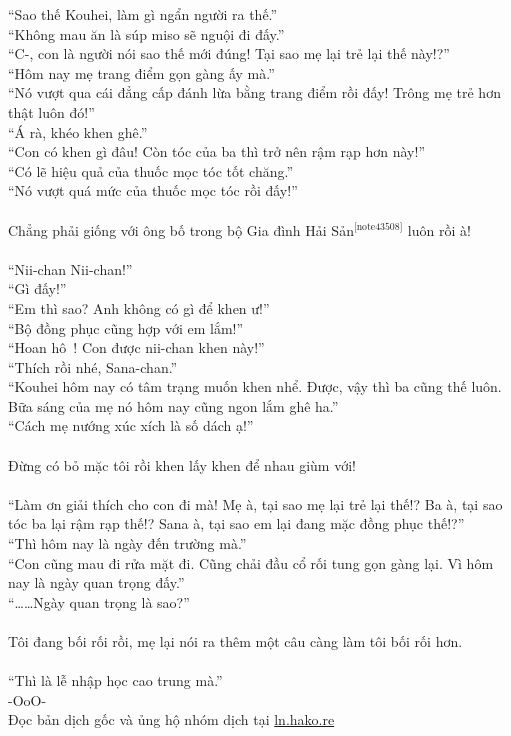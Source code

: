 \documentclass[12pt,a4paper, twosides]{book}
\begin{document}
“Sao thế Kouhei, làm gì ngẩn người ra thế.”\\
“Không mau ăn là súp miso sẽ nguội đi đấy.”\\
“C-, con là người nói sao thế mới đúng! Tại sao mẹ lại trẻ lại thế này!?”\\
“Hôm nay mẹ trang điểm gọn gàng ấy mà.”\\
“Nó vượt qua cái đẳng cấp đánh lừa bằng trang điểm rồi đấy! Trông mẹ trẻ hơn thật luôn đó!”\\
“Á rà, khéo khen ghê.”\\
“Con có khen gì đâu! Còn tóc của ba thì trở nên rậm rạp hơn này!”\\
“Có lẽ hiệu quả của thuốc mọc tóc tốt chăng.”\\
“Nó vượt quá mức của thuốc mọc tóc rồi đấy!”\\
\\
Chẳng phải giống với ông bố trong bộ Gia đình Hải Sản$^\text{[note43508]}$ luôn rồi à!\\
\\
“Nii-chan Nii-chan!”\\
“Gì đấy!”\\
“Em thì sao? Anh không có gì để khen ư!”\\
“Bộ đồng phục cũng hợp với em lắm!”\\
“Hoan hô~! Con được nii-chan khen này!”\\
“Thích rồi nhé, Sana-chan.”\\
“Kouhei hôm nay có tâm trạng muốn khen nhể. Được, vậy thì ba cũng thế luôn. Bữa sáng của mẹ nó hôm nay cũng ngon lắm ghê ha.”\\
“Cách mẹ nướng xúc xích là số dách ạ!”\\
\\
Đừng có bỏ mặc tôi rồi khen lấy khen để nhau giùm với!\\
\\
“Làm ơn giải thích cho con đi mà! Mẹ à, tại sao mẹ lại trẻ lại thế!? Ba à, tại sao tóc ba lại rậm rạp thế!? Sana à, tại sao em lại đang mặc đồng phục thế!?”\\
“Thì hôm nay là ngày đến trường mà.”\\
“Con cũng mau đi rửa mặt đi. Cũng chải đầu cổ rối tung gọn gàng lại. Vì hôm nay là ngày quan trọng đấy.”\\
“……Ngày quan trọng là sao?”\\
\\
Tôi đang bối rối rồi, mẹ lại nói ra thêm một câu càng làm tôi bối rối hơn.\\
\\
“Thì là lễ nhập học cao trung mà.”\\
-OoO-\\
Đọc bản dịch gốc và ủng hộ nhóm dịch tại \href{https://ln.hako.re/}{ln.hako.re}\\
\newpage
\end{document}
